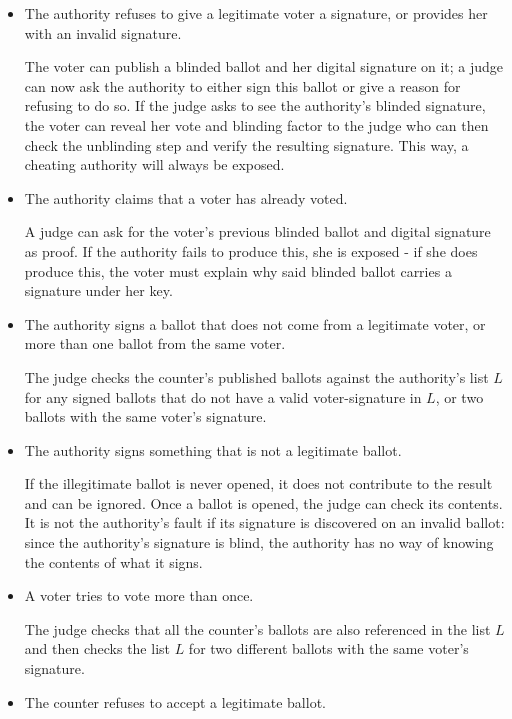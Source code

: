 \documentclass[envcountsame]{llncs}
\begin{document}
\begin{itemize}
\item The authority refuses to give a legitimate voter a signature, or provides
her with an invalid signature.

The voter can publish a blinded ballot and her digital signature on it;
a judge can now ask the authority to either sign this ballot or give a reason
for refusing to do so. If the judge asks to see the authority's blinded
signature, the voter can reveal her vote and blinding factor to the judge who
can then check the unblinding step and verify the resulting signature.
This way, a cheating authority will always be exposed.

\item The authority claims that a voter has already voted.

A judge can ask for the voter's previous blinded ballot and digital signature as
proof. If the authority fails to produce this, she is exposed - if she does
produce this, the voter must explain why said blinded ballot carries a signature
under her key.

\item The authority signs a ballot that does not come from a legitimate voter,
or more than one ballot from the same voter.

The judge checks the counter's published ballots against the authority's list
$L$ for any signed ballots that do not have a valid voter-signature in $L$, or
two ballots with the same voter's signature.

\item The authority signs something that is not a legitimate ballot.

If the illegitimate ballot is never opened, it does not contribute to the result
and can be ignored. Once a ballot is opened, the judge can check its contents.
It is not the authority's fault if its signature is discovered on an invalid
ballot: since the authority's signature is blind, the authority has no way of
knowing the contents of what it signs.

\item A voter tries to vote more than once.

The judge checks that all the counter's ballots are also referenced in the list
$L$ and then checks the list $L$ for two different ballots with the same voter's
signature.

\item The counter refuses to accept a legitimate ballot.


\end{itemize}
\end{document}
